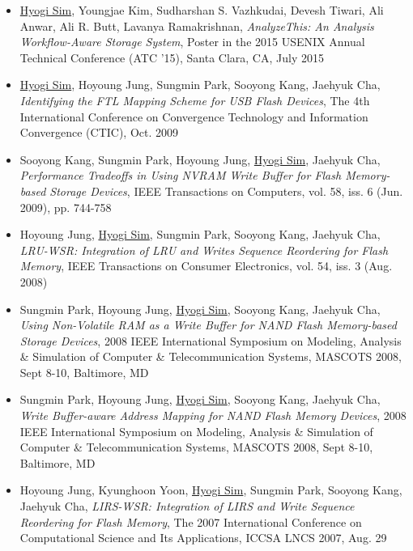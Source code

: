 \begin{itemize}
\item \underline{Hyogi Sim}, Youngjae Kim, Sudharshan S. Vazhkudai,
  Devesh Tiwari, Ali Anwar, Ali R. Butt, Lavanya Ramakrishnan,
  {\it AnalyzeThis: An Analysis Workflow-Aware Storage System},
  Poster in the 2015 USENIX Annual Technical Conference (ATC '15),
  Santa Clara, CA, July 2015
\item \underline{Hyogi Sim}, Hoyoung Jung, Sungmin Park, Sooyong Kang, Jaehyuk Cha,
  {\it Identifying the FTL Mapping Scheme for USB Flash Devices},
  The 4th International Conference on Convergence Technology
  and Information Convergence (CTIC), Oct. 2009 %
\item Sooyong Kang, Sungmin Park, Hoyoung Jung, \underline{Hyogi Sim}, Jaehyuk Cha,
  {\it Performance Tradeoffs in Using NVRAM Write Buffer for Flash Memory-based
  Storage Devices},
  IEEE Transactions on Computers, vol. 58, iss. 6 (Jun. 2009), pp. 744-758
\item Hoyoung Jung, \underline{Hyogi Sim}, Sungmin Park, Sooyong Kang, Jaehyuk Cha,
 {\it LRU-WSR: Integration of LRU and Writes Sequence Reordering for Flash
 Memory},
 IEEE Transactions on Consumer Electronics, vol. 54, iss. 3 (Aug. 2008)
\item Sungmin Park, Hoyoung Jung, \underline{Hyogi Sim}, Sooyong Kang, Jaehyuk Cha,
 {\it Using Non-Volatile RAM as a Write Buffer for NAND Flash Memory-based
 Storage Devices},
 2008 IEEE International Symposium on Modeling, Analysis \& Simulation of
 Computer \& Telecommunication Systems, MASCOTS 2008, Sept 8-10, Baltimore, MD
\item Sungmin Park, Hoyoung Jung, \underline{Hyogi Sim}, Sooyong Kang, Jaehyuk Cha,
 {\it Write Buffer-aware Address Mapping for NAND Flash Memory Devices},
 2008 IEEE International Symposium on Modeling, Analysis \& Simulation of
 Computer \& Telecommunication Systems, MASCOTS 2008, Sept 8-10, Baltimore, MD
\item Hoyoung Jung, Kyunghoon Yoon, \underline{Hyogi Sim},
 Sungmin Park, Sooyong Kang, Jaehyuk Cha,
 {\it LIRS-WSR: Integration of LIRS and Write Sequence Reordering for Flash
 Memory},
 The 2007 International Conference on Computational Science and Its
 Applications, ICCSA LNCS 2007, Aug. 29
\end{itemize}

